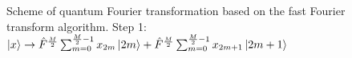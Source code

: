 \begin{figure}
\centering



\caption{Scheme of quantum Fourier transformation based on the fast Fourier transform algorithm. Step 1: 
$\ket{x} \rightarrow
\hat{F}^{\frac{M}{2}} \sum_{m = 0}^{\frac{M}{2} - 1}x_{2m} \ket{2m} +
\hat{F}^{\frac{M}{2}} \sum_{m = 0}^{\frac{M}{2} - 1}x_{2m + 1} \ket{2m+1}$}
\label{figQuantCompQuantFourier1}
\end{figure}
